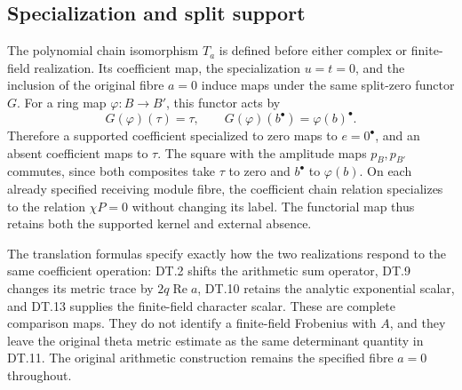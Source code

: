 \subsection{Specialization and split support}
The polynomial chain isomorphism \(T_a\) is defined before either
complex or finite-field realization. Its coefficient map, the
specialization \(u=t=0\), and the inclusion of the original fibre
\(a=0\) induce maps under the same split-zero functor \(G\).
For a ring map \(\varphi:B\to B'\), this functor acts by
\[
 G(\varphi)(\tau)=\tau,\qquad
 G(\varphi)(b^\bullet)=\varphi(b)^\bullet.
\]
Therefore a supported coefficient specialized to zero maps to
\(e=0^\bullet\), and an absent coefficient maps to \(\tau\).
The square with the amplitude maps \(p_B,p_{B'}\) commutes, since
both composites take \(\tau\) to zero and \(b^\bullet\) to
\(\varphi(b)\). On each already specified receiving module fibre,
the coefficient chain relation specializes to the relation
\(\chi P=0\) without changing its label. The functorial map thus
retains both the supported kernel and external absence.

The translation formulas specify exactly how the two realizations
respond to the same coefficient operation: DT.2 shifts the arithmetic
sum operator, DT.9 changes its metric trace by \(2q\operatorname{Re}a\),
DT.10 retains the analytic exponential scalar, and DT.13 supplies the
finite-field character scalar. These are complete comparison maps.
They do not identify a finite-field Frobenius with \(A\), and they
leave the original theta metric estimate as the same determinant
quantity in DT.11. The original arithmetic construction remains
the specified fibre \(a=0\) throughout.

\endgroup
